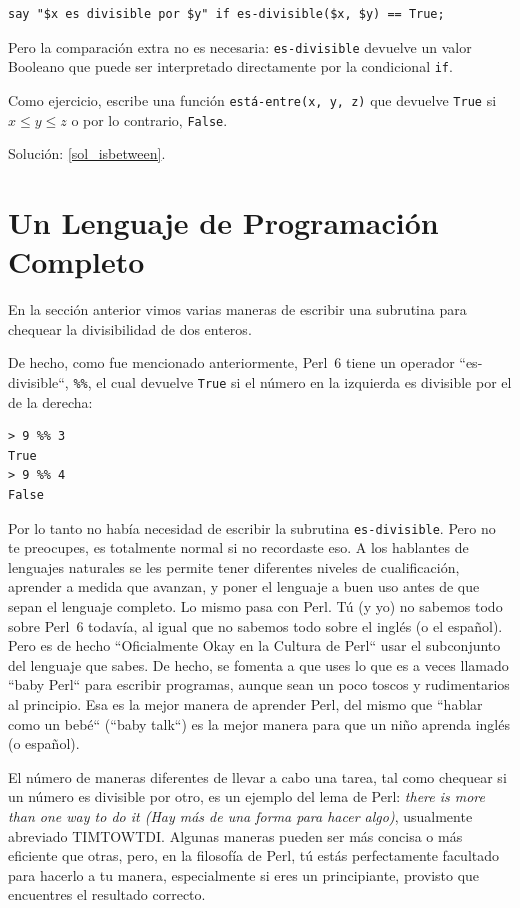 \begin{verbatim}
say "$x es divisible por $y" if es-divisible($x, $y) == True;
\end{verbatim}
%
Pero la comparación extra no es necesaria: 
{\tt es-divisible} devuelve un valor Booleano que puede ser
interpretado directamente por la condicional {\tt if}.

\label{isbetween}
Como ejercicio, escribe una función \verb|está-entre(x, y, z)|
que devuelve {\tt True} si $x \le y \le z$ o por lo contrario,
{\tt False}.

Solución: \ref{sol_isbetween}.

\section{Un Lenguaje de Programación Completo}

En la sección anterior vimos varias maneras de escribir
una subrutina para chequear la divisibilidad de dos 
enteros.

De hecho, como fue mencionado anteriormente, Perl~6
tiene un operador ``es-divisible``, \verb|%%|, el cual
devuelve {\tt True} si el número en la izquierda es divisible
por el de la derecha:

\begin{verbatim}
> 9 %% 3
True
> 9 %% 4
False
\end{verbatim}

Por lo tanto no había necesidad de escribir la subrutina
{\tt es-divisible}. Pero no te preocupes, es totalmente 
normal si no recordaste eso. A los hablantes de lenguajes 
naturales se les permite tener diferentes niveles de cualificación,
aprender a medida que avanzan, y poner el lenguaje a buen uso 
antes de que sepan el lenguaje completo. Lo mismo pasa con Perl.
Tú (y yo) no sabemos todo sobre Perl~6 todavía, al igual que no
sabemos todo sobre el inglés (o el español). Pero es de hecho 
``Oficialmente Okay en la Cultura de Perl`` usar el subconjunto
del lenguaje que sabes. De hecho, se fomenta a que uses lo que es
a veces llamado ``baby Perl`` para escribir programas, aunque sean
un poco toscos y rudimentarios al principio. Esa es la mejor manera 
de aprender Perl, del mismo que ``hablar como un bebé`` (``baby talk``) es
la mejor manera para que un niño aprenda inglés (o español).

El número de maneras diferentes de llevar a cabo una tarea,
tal como chequear si un número es divisible por otro,
es un ejemplo del lema de Perl:
\emph{there is more than one way to do it 
(Hay más de una forma para hacer algo)}, usualmente abreviado TIMTOWTDI.
Algunas maneras pueden ser más concisa o más eficiente que
otras, pero, en la filosofía de Perl, tú estás perfectamente 
facultado para hacerlo a tu manera, especialmente si eres
un principiante, provisto que encuentres el resultado 
correcto.

